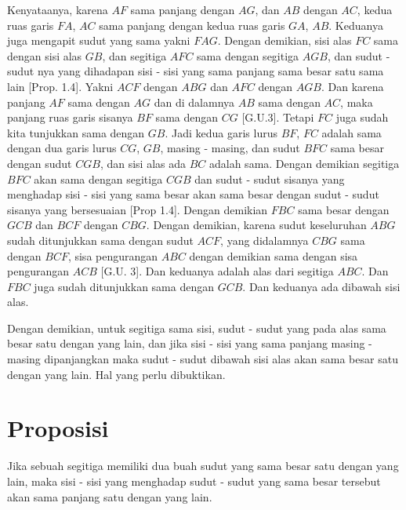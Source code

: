 \documentclass[a4paper]{book}
\begin{document}
Kenyataanya, karena $AF$ sama panjang dengan $AG$, dan $AB$ dengan $AC$, kedua
ruas garis $FA$, $AC$ sama panjang dengan kedua ruas garis $GA$, $AB$. Keduanya
juga mengapit sudut yang sama yakni $FAG$. Dengan demikian, sisi alas $FC$ sama 
dengan sisi alas $GB$, dan segitiga $AFC$ sama dengan segitiga $AGB$, dan sudut
- sudut nya yang dihadapan sisi - sisi yang sama panjang sama besar satu sama
lain [Prop. 1.4]. Yakni $ACF$ dengan $ABG$ dan $AFC$ dengan $AGB$. Dan karena
panjang $AF$ sama dengan $AG$ dan di dalamnya $AB$ sama dengan $AC$, maka panjang
ruas garis sisanya $BF$ sama dengan $CG$ [G.U.3]. Tetapi $FC$ juga sudah kita
tunjukkan sama dengan $GB$. Jadi kedua garis lurus $BF$, $FC$ adalah sama dengan
dua garis lurus $CG$, $GB$, masing - masing, dan sudut $BFC$ sama besar dengan 
sudut $CGB$, dan sisi alas ada $BC$ adalah sama. Dengan demikian 
segitiga $BFC$ akan sama dengan segitiga $CGB$ dan sudut - sudut sisanya yang
menghadap sisi - sisi yang sama besar akan sama besar dengan 
sudut - sudut sisanya yang bersesuaian [Prop 1.4]. Dengan demikian $FBC$ sama
besar dengan $GCB$ dan $BCF$ dengan $CBG$. Dengan demikian, karena sudut 
keseluruhan $ABG$ sudah ditunjukkan sama dengan sudut $ACF$, yang didalamnya 
$CBG$ sama dengan $BCF$, sisa pengurangan $ABC$ dengan demikian sama dengan 
sisa pengurangan $ACB$ [G.U. 3]. Dan keduanya adalah alas dari segitiga $ABC$.
Dan $FBC$ juga sudah ditunjukkan sama dengan $GCB$. Dan keduanya ada dibawah
sisi alas.

Dengan demikian, untuk segitiga sama sisi, sudut - sudut yang pada alas sama
besar satu dengan yang lain, dan jika sisi - sisi yang sama panjang 
masing - masing dipanjangkan maka sudut - sudut dibawah sisi alas akan sama 
besar satu dengan yang lain. Hal yang perlu dibuktikan.

\section*{\centering Proposisi \thesection} 

Jika sebuah segitiga memiliki dua buah sudut yang sama besar satu dengan yang 
lain, maka sisi - sisi yang menghadap sudut - sudut yang sama besar tersebut
akan sama panjang satu dengan yang lain.
\begin{center}
\end{center} 
\end{document}

